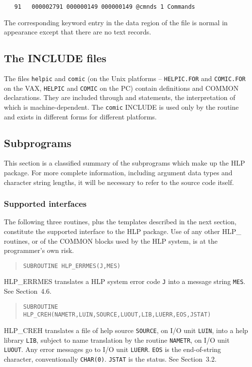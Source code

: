 \begin{verbatim}
   91   000002791 000000149 000000149 @cmnds 1 Commands
\end{verbatim}

The corresponding keyword entry in the data region of the file is
normal in appearance except that there are no text records.

\subsection{The INCLUDE files}
The files
{\tt helpic} and {\tt comic}
(on the Unix platforms -- {\tt HELPIC.FOR} and {\tt COMIC.FOR} on the VAX,
{\tt HELPIC} and {\tt COMIC} on the PC) contain definitions and
COMMON declarations.  They are included through 
and  statements, the 
interpretation of which is machine-dependent.
The {\tt comic} INCLUDE is used only by the 
routine and exists in different forms for different platforms.

\subsection{Subprograms}
This section is a classified summary of the subprograms
which make up the HLP package.  For more complete information,
including argument data types and character string lengths, it will
be necessary to refer to the source code itself.

\subsubsection{Supported interfaces}
The following three routines, plus the templates described in the
next section, constitute the supported interface
to the HLP package.  Use of any other HLP\_ routines, or of the
COMMON blocks used by the HLP system, is at the
programmer's own risk.
\begin{verse}
{\tt SUBROUTINE HLP\_ERRMES(J,MES)}
\end{verse}
HLP\_ERRMES translates a HLP system error code {\tt J}
into a message string {\tt MES}.  See Section~4.6.

\begin{verse}
{\tt SUBROUTINE HLP\_CREH(NAMETR,LUIN,SOURCE,LUOUT,LIB,LUERR,EOS,JSTAT)}
\end{verse}
HLP\_CREH translates a file of help source {\tt SOURCE},
on I/O unit {\tt LUIN}, into a help library {\tt LIB}, subject
to name translation by the routine {\tt NAMETR}, on I/O
unit {\tt LUOUT}.  Any error messages go to I/O unit {\tt LUERR}.
{\tt EOS} is the end-of-string character, conventionally {\tt CHAR(0)}.
{\tt JSTAT} is the status.  See Section~3.2.

